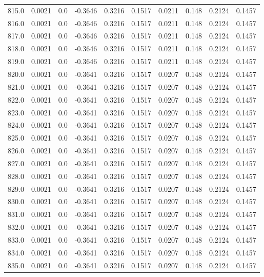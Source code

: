 \begin{longtable}{lrrrrrrrrr}
815.0 & 0.0021 & 0.0 & -0.3646 & 0.3216 & 0.1517 & 0.0211 & 0.148 & 0.2124 & 0.1457 \\
816.0 & 0.0021 & 0.0 & -0.3646 & 0.3216 & 0.1517 & 0.0211 & 0.148 & 0.2124 & 0.1457 \\
817.0 & 0.0021 & 0.0 & -0.3646 & 0.3216 & 0.1517 & 0.0211 & 0.148 & 0.2124 & 0.1457 \\
818.0 & 0.0021 & 0.0 & -0.3646 & 0.3216 & 0.1517 & 0.0211 & 0.148 & 0.2124 & 0.1457 \\
819.0 & 0.0021 & 0.0 & -0.3646 & 0.3216 & 0.1517 & 0.0211 & 0.148 & 0.2124 & 0.1457 \\
820.0 & 0.0021 & 0.0 & -0.3641 & 0.3216 & 0.1517 & 0.0207 & 0.148 & 0.2124 & 0.1457 \\
821.0 & 0.0021 & 0.0 & -0.3641 & 0.3216 & 0.1517 & 0.0207 & 0.148 & 0.2124 & 0.1457 \\
822.0 & 0.0021 & 0.0 & -0.3641 & 0.3216 & 0.1517 & 0.0207 & 0.148 & 0.2124 & 0.1457 \\
823.0 & 0.0021 & 0.0 & -0.3641 & 0.3216 & 0.1517 & 0.0207 & 0.148 & 0.2124 & 0.1457 \\
824.0 & 0.0021 & 0.0 & -0.3641 & 0.3216 & 0.1517 & 0.0207 & 0.148 & 0.2124 & 0.1457 \\
825.0 & 0.0021 & 0.0 & -0.3641 & 0.3216 & 0.1517 & 0.0207 & 0.148 & 0.2124 & 0.1457 \\
826.0 & 0.0021 & 0.0 & -0.3641 & 0.3216 & 0.1517 & 0.0207 & 0.148 & 0.2124 & 0.1457 \\
827.0 & 0.0021 & 0.0 & -0.3641 & 0.3216 & 0.1517 & 0.0207 & 0.148 & 0.2124 & 0.1457 \\
828.0 & 0.0021 & 0.0 & -0.3641 & 0.3216 & 0.1517 & 0.0207 & 0.148 & 0.2124 & 0.1457 \\
829.0 & 0.0021 & 0.0 & -0.3641 & 0.3216 & 0.1517 & 0.0207 & 0.148 & 0.2124 & 0.1457 \\
830.0 & 0.0021 & 0.0 & -0.3641 & 0.3216 & 0.1517 & 0.0207 & 0.148 & 0.2124 & 0.1457 \\
831.0 & 0.0021 & 0.0 & -0.3641 & 0.3216 & 0.1517 & 0.0207 & 0.148 & 0.2124 & 0.1457 \\
832.0 & 0.0021 & 0.0 & -0.3641 & 0.3216 & 0.1517 & 0.0207 & 0.148 & 0.2124 & 0.1457 \\
833.0 & 0.0021 & 0.0 & -0.3641 & 0.3216 & 0.1517 & 0.0207 & 0.148 & 0.2124 & 0.1457 \\
834.0 & 0.0021 & 0.0 & -0.3641 & 0.3216 & 0.1517 & 0.0207 & 0.148 & 0.2124 & 0.1457 \\
835.0 & 0.0021 & 0.0 & -0.3641 & 0.3216 & 0.1517 & 0.0207 & 0.148 & 0.2124 & 0.1457 \\

\end{longtable}
